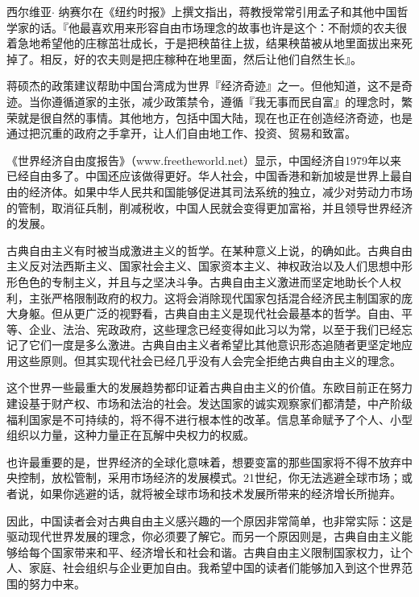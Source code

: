 西尔维亚$\cdot$ 纳赛尔在《纽约时报》上撰文指出，蒋教授常常引用孟子和其他中国哲学家的话。『他最喜欢用来形容自由市场理念的故事也许是这个：不耐烦的农夫很着急地希望他的庄稼茁壮成长，于是把秧苗往上拔，结果秧苗被从地里面拔出来死掉了。相反，好的农夫则是把庄稼种在地里面，然后让他们自然生长』。

蒋硕杰的政策建议帮助中国台湾成为世界『经济奇迹』之一。但他知道，这不是奇迹。当你遵循道家的主张，减少政策禁令，遵循『我无事而民自富』的理念时，繁荣就是很自然的事情。其他地方，包括中国大陆，现在也正在创造经济奇迹，也是通过把沉重的政府之手拿开，让人们自由地工作、投资、贸易和致富。

《世界经济自由度报告》（www.freetheworld.net）显示，中国经济自1979年以来已经自由多了。中国还应该做得更好。华人社会，中国香港和新加坡是世界上最自由的经济体。如果中华人民共和国能够促进其司法系统的独立，减少对劳动力市场的管制，取消征兵制，削减税收，中国人民就会变得更加富裕，并且领导世界经济的发展。

古典自由主义有时被当成激进主义的哲学。在某种意义上说，的确如此。古典自由主义反对法西斯主义、国家社会主义、国家资本主义、神权政治以及人们思想中形形色色的专制主义，并且与之坚决斗争。古典自由主义激进而坚定地助长个人权利，主张严格限制政府的权力。这将会消除现代国家包括混合经济民主制国家的庞大身躯。但从更广泛的视野看，古典自由主义是现代社会最基本的哲学。自由、平等、企业、法治、宪政政府，这些理念已经变得如此习以为常，以至于我们已经忘记了它们一度是多么激进。古典自由主义者希望比其他意识形态追随者更坚定地应用这些原则。但其实现代社会已经几乎没有人会完全拒绝古典自由主义的理念。

这个世界一些最重大的发展趋势都印证着古典自由主义的价值。东欧目前正在努力建设基于财产权、市场和法治的社会。发达国家的诚实观察家们都清楚，中产阶级福利国家是不可持续的，将不得不进行根本性的改革。信息革命赋予了个人、小型组织以力量，这种力量正在瓦解中央权力的权威。

也许最重要的是，世界经济的全球化意味着，想要变富的那些国家将不得不放弃中央控制，放松管制，采用市场经济的发展模式。21世纪，你无法逃避全球市场；或者说，如果你逃避的话，就将被全球市场和技术发展所带来的经济增长所抛弃。

因此，中国读者会对古典自由主义感兴趣的一个原因非常简单，也非常实际：这是驱动现代世界发展的理念，你必须要了解它。而另一个原因则是，古典自由主义能够给每个国家带来和平、经济增长和社会和谐。古典自由主义限制国家权力，让个人、家庭、社会组织与企业更加自由。我希望中国的读者们能够加入到这个世界范围的努力中来。


